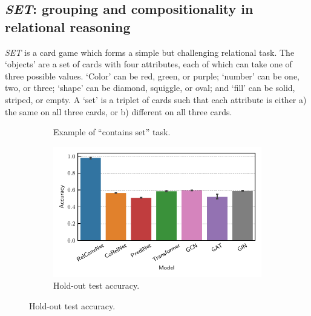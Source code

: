 \subsection{\textit{SET}: grouping and compositionality in relational reasoning}\label{ssec:experiments_set}

\textit{SET} is a card game which forms a simple but challenging relational task. The `objects' are a set of cards with four attributes, each of which can take one of three possible values. `Color' can be red, green, or purple; `number' can be one, two, or three; `shape' can be diamond, squiggle, or oval; and `fill' can be solid, striped, or empty. A `set' is a triplet of cards such that each attribute is either a) the same on all three cards, or b) different on all three cards.

\begin{figure}[ht]
    \vskip-10pt
    \centering
    \begin{subfigure}[b]{0.49\textwidth}
        \centering
        \caption{Example of ``contains set'' task.}\label{fig:contains_set_example}
    \end{subfigure}
    \begin{subfigure}[b]{0.5\textwidth}
        \centering
        \includegraphics[width=\textwidth]{figs/experiments/contains_set_acc.pdf}
        \vskip-5pt
        \caption{\footnotesize{Hold-out test accuracy.}}\label{fig:contains_set_acc}
    \end{subfigure}


\end{figure}
